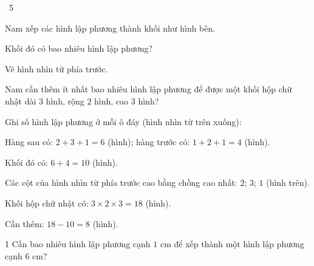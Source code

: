 \begin{exbox}{\ExWord\ 5}
\begin{minipage}[t]{0.58\linewidth}
Nam xếp các hình lập phương thành khối như hình bên.\par
{} Khối đó có bao nhiêu hình lập phương?\par
{} Vẽ hình nhìn từ phía trước.\par
{} Nam cần thêm ít nhất bao nhiêu hình lập phương để được một khối hộp chữ nhật dài $3$ hình, rộng $2$ hình, cao $3$ hình?
\end{minipage}\hfill
\begin{minipage}[t]{0.38\linewidth}\vspace{0pt}\centering
{}
\end{minipage}
\guide
{} Ghi số hình lập phương ở mỗi ô đáy (hình nhìn từ trên xuống):\par
\begin{center}\qquad
{}\end{center}
Hàng sau có: $2+3+1=6$ (hình); hàng trước có: $1+2+1=4$ (hình).\par
Khối đó có: $6+4=10$ (hình).\par
{} Các cột của hình nhìn từ phía trước cao bằng chồng cao nhất: $2$; $3$; $1$ (hình trên).\par
{} Khối hộp chữ nhật có: $3\times2\times3=18$ (hình).\par
Cần thêm: $18-10=8$ (hình).
\end{exbox}
\begin{probbox}{1}{\relax}
Cần bao nhiêu hình lập phương cạnh $1$ cm để xếp thành một hình lập phương cạnh $6$ cm?
\end{probbox}
